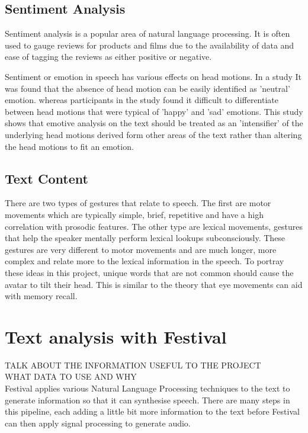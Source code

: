 \documentclass[bsc,frontabs,twoside,singlespacing,parskip]{infthesis}
\begin{document}
\subsection{Sentiment Analysis}

Sentiment analysis is a popular area of natural language processing. It is often used to gauge reviews for products\cite{sentiment_online} and films\cite{sentiment_films} due to the availability of data and ease of tagging the reviews as either positive or negative.

Sentiment or emotion in speech has various effects on head motions. In a study It was found that the absence of head motion can be easily identified as 'neutral' emotion. \cite{emotion_head_motion} whereas participants in the study found it difficult to differentiate between head motions that were typical of 'happy' and 'sad' emotions. This study shows that emotive analysis on the text should be treated as an 'intensifier' of the underlying head motions derived form other areas of the text rather than altering the head motions to fit an emotion.

\subsection{Text Content}

There are two types of gestures that relate to speech. \cite{lexical_gestures} The first are motor movements which are typically simple, brief, repetitive and have a high correlation with prosodic features. The other type are lexical movements, gestures that help the speaker mentally perform lexical lookups subconsciously. These gestures are very different to motor movements and are much longer, more complex and relate more to the lexical information in the speech. To portray these ideas in this project, unique words that are not common should cause the avatar to tilt their head. This is similar to the theory that eye movements can aid with memory recall. \cite{eye_movements}

\section{Text analysis with Festival}
TALK ABOUT THE INFORMATION USEFUL TO THE PROJECT \\
WHAT DATA TO USE AND WHY\\


Festival applies various Natural Language Processing techniques to the text to generate information  so that it can synthesise speech.  There are many steps in this pipeline, each adding a little bit more information to the text before Festival can then apply signal processing to generate audio. 
\end{document}
